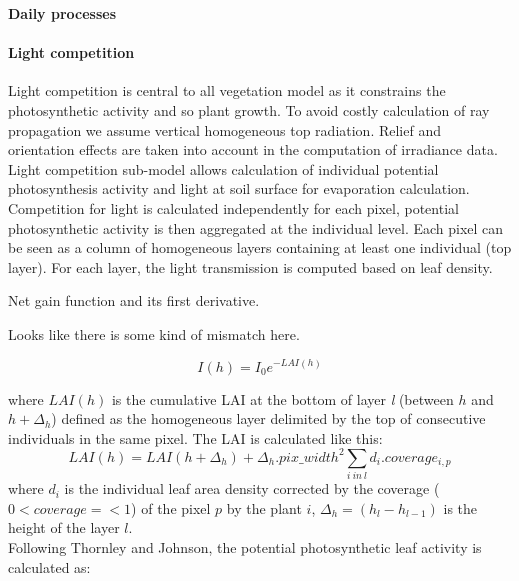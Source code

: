 \textbf{Daily processes}

\paragraph{Light competition}Light competition is central to all vegetation model as it constrains the photosynthetic activity and so plant growth. To avoid costly calculation of ray propagation we assume vertical homogeneous top radiation. Relief and orientation effects are taken into account in the computation of irradiance data.\\
Light competition sub-model allows calculation of individual potential photosynthesis activity and light at soil surface for evaporation calculation.\\
Competition for light is calculated independently for each pixel, potential photosynthetic activity is then aggregated at the individual level. Each pixel can be seen as a column of homogeneous layers containing at least one individual (top layer). For each layer, the light transmission is computed based on leaf density.


\begin{marginfigure}
\label{fig:derivaives}
\caption{Net gain function and its first derivative.} Looks like there is some kind of mismatch here.
\end{marginfigure}

\begin{equation}\label{eq:Ih}
I(h) =  I_{0} e^{-LAI(h)}
\end{equation}

where $LAI(h)$ is the cumulative LAI at the bottom of layer \textit{l} (between $h$ and $h+\Delta_{h}$) defined as the homogeneous layer delimited by the top of consecutive individuals in the same pixel. The LAI is calculated like this:
\begin{equation}\label{eq:LAI}
LAI(h) = LAI(h+\Delta_{h}) +   \Delta_{h} . pix\_width^{2} \sum_{i\ in\ l}d_{i}.coverage_{i, p}
\end{equation}
where $d_{i}$ is the individual leaf area density corrected by the coverage ($0< coverage =< 1$) of the pixel $p$ by the plant $i$, $\Delta_{h} = (h_{l} - h_{l-1})$ is the height of the layer $l$.\\
Following Thornley and Johnson, the potential photosynthetic leaf activity is calculated as:


